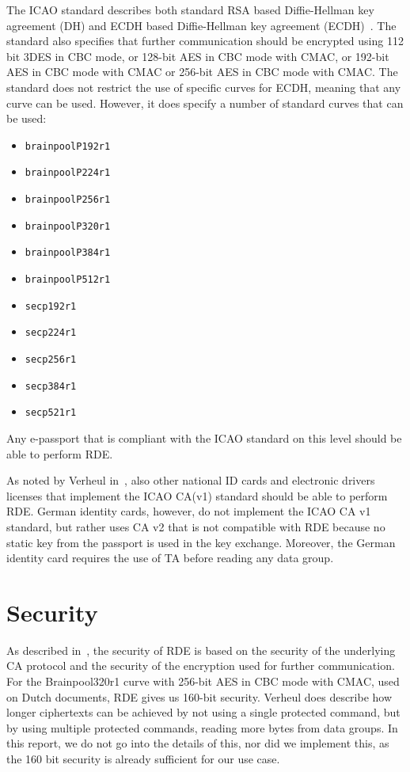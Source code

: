 The ICAO standard describes both standard RSA based Diffie-Hellman key agreement (DH) and ECDH based Diffie-Hellman key agreement (ECDH)~\cite{icao9303securitymechanisms}.
The standard also specifies that further communication should be encrypted using 112 bit 3DES in CBC mode, or 128-bit AES in CBC mode with CMAC, or 192-bit AES in CBC mode with CMAC or 256-bit AES in CBC mode with CMAC.
The standard does not restrict the use of specific curves for ECDH, meaning that any curve can be used.
However, it does specify a number of standard curves that can be used:
\begin{itemize}
    \item \texttt{brainpoolP192r1}
    \item \texttt{brainpoolP224r1}
    \item \texttt{brainpoolP256r1}
    \item \texttt{brainpoolP320r1}
    \item \texttt{brainpoolP384r1}
    \item \texttt{brainpoolP512r1}
    \item \texttt{secp192r1}
    \item \texttt{secp224r1}
    \item \texttt{secp256r1}
    \item \texttt{secp384r1}
    \item \texttt{secp521r1}
\end{itemize}
Any e-passport that is compliant with the ICAO standard on this level should be able to perform RDE.

As noted by Verheul in~\cite{verheul2017remote}, also other national ID cards and electronic drivers licenses that implement the ICAO CA(v1) standard should be able to perform RDE.
German identity cards, however, do not implement the ICAO CA v1 standard, but rather uses CA v2 that is not compatible with RDE because no static key from the passport is used in the key exchange.
Moreover, the German identity card requires the use of TA before reading any data group.

\section{Security}
\label{sec:security}
As described in~\cite{verheul2017remote}, the security of RDE is based on the security of the underlying CA protocol and the security of the encryption used for further communication.
For the Brainpool320r1 curve with 256-bit AES in CBC mode with CMAC, used on Dutch documents, RDE gives us 160-bit security.
Verheul does describe how longer ciphertexts can be achieved by not using a single protected command, but by using multiple protected commands, reading more bytes from data groups.
In this report, we do not go into the details of this, nor did we implement this, as the 160 bit security is already sufficient for our use case.

